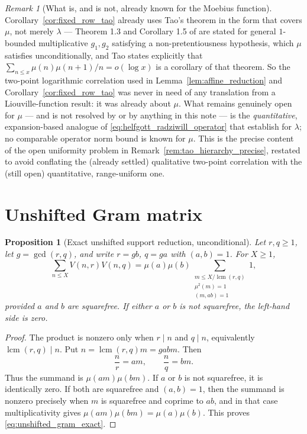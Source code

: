 \documentclass[11pt]{amsart}
\numberwithin{equation}{section}
\theoremstyle{plain}
\newtheorem{proposition}[theorem]{Proposition}
\theoremstyle{definition}
\theoremstyle{remark}
\newtheorem{remark}[theorem]{Remark}
\newcommand{\mob}{\mu}
\newcommand{\Vjump}{V}
\begin{document}
\begin{remark}[What is, and is not, already known for the Moebius function]
\label{rem:mu_vs_lambda_status}
Corollary~\ref{cor:fixed_row_tao} already uses Tao's theorem in the form that covers \(\mob\), not merely \(\lambda\) — Theorem 1.3 and Corollary 1.5 of \cite{Tao2016} are stated for general \(1\)-bounded multiplicative \(g_1,g_2\) satisfying a non-pretentiousness hypothesis, which \(\mob\) satisfies unconditionally, and Tao states explicitly that \(\sum_{n\le x}\mob(n)\mob(n+1)/n=o(\log x)\) is a corollary of that theorem.  So the two-point logarithmic correlation used in Lemma~\ref{lem:affine_reduction} and Corollary~\ref{cor:fixed_row_tao} was never in need of any translation from a Liouville-function result: it was already about \(\mob\).  What remains genuinely open for \(\mob\) — and is not resolved by \cite{Tao2016} or by anything in this note — is the \emph{quantitative}, expansion-based analogue of \eqref{eq:helfgott_radziwill_operator} that \cite{HelfgottRadziwill2021,Pilatte2023} establish for \(\lambda\); no comparable operator norm bound is known for \(\mob\).  This is the precise content of the open uniformity problem in Remark~\ref{rem:tao_hierarchy_precise}, restated to avoid conflating the (already settled) qualitative two-point correlation with the (still open) quantitative, range-uniform one.
\end{remark}

\section{Unshifted Gram matrix}
\label{sec:unshifted_gram}

\begin{proposition}[Exact unshifted support reduction, unconditional]
\label{prop:unshifted_gram}
Let \(r,q\ge1\), let \(g=\gcd(r,q)\), and write \(r=gb\), \(q=ga\) with \((a,b)=1\).  For \(X\ge1\),
\begin{equation}
\sum_{n\le X}\Vjump(n,r)\Vjump(n,q)
=\mob(a)\mob(b)\sum_{\substack{m\le X/\operatorname{lcm}(r,q)\\\mob^2(m)=1\\(m,ab)=1}}1,
\label{eq:unshifted_gram_exact}
\end{equation}
provided \(a\) and \(b\) are squarefree.  If either \(a\) or \(b\) is not squarefree, the left-hand side is zero.
\end{proposition}

\begin{proof}
The product is nonzero only when \(r\mid n\) and \(q\mid n\), equivalently \(\operatorname{lcm}(r,q)\mid n\).  Put \(n=\operatorname{lcm}(r,q)m=gabm\).  Then
\begin{equation}
\frac{n}{r}=am,
\qquad
\frac{n}{q}=bm.
\label{eq:unshifted_ratios}
\end{equation}
Thus the summand is \(\mob(am)\mob(bm)\).  If \(a\) or \(b\) is not squarefree, it is identically zero.  If both are squarefree and \((a,b)=1\), then the summand is nonzero precisely when \(m\) is squarefree and coprime to \(ab\), and in that case multiplicativity gives \(\mob(am)\mob(bm)=\mob(a)\mob(b)\).  This proves \eqref{eq:unshifted_gram_exact}.
\end{proof}
\end{document}
